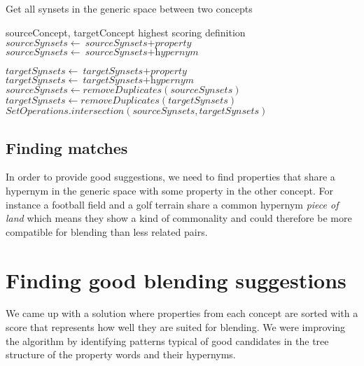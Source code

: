 \begin{algorithm}
	\caption{Get all synsets in the generic space between two concepts}\label{euclid}
	\begin{algorithmic}[1]
		\Require sourceConcept,
		targetConcept
		\Ensure highest scoring definition
		\State ${\textit{sourceSynsets} \gets {\textit{sourceSynsets} + \textit{property}}}$
		\State ${\textit{sourceSynsets} \gets {\textit{sourceSynsets} + \textit{hypernym}}}$
		\EndFor
		\EndFor
		
		\State ${\textit{targetSynsets} \gets {\textit{targetSynsets} + \textit{property}}}$
		\State ${\textit{targetSynsets} \gets {\textit{targetSynsets} + \textit{hypernym}}}$
		\EndFor
		\EndFor
		\State ${\textit{sourceSynsets} \gets {removeDuplicates(\textit{sourceSynsets})}}$
		\State ${\textit{targetSynsets} \gets {removeDuplicates(\textit{targetSynsets})}}$
		\State \Return ${SetOperations.intersection(\textit{sourceSynsets}, \textit{targetSynsets})}$
		\EndProcedure
	\end{algorithmic}
\end{algorithm}

\subsection{Finding matches}
In order to provide good suggestions, we need to find properties that share a hypernym in the generic space with some property in the other concept. For instance a football field and a golf terrain share a common hypernym \emph{piece of land} which means they show a kind of commonality and could therefore be more compatible for blending than less related pairs. 


\section{Finding good blending suggestions}
We came up with a solution where properties from each concept are sorted with a score that represents how well they are suited for blending. We were improving the algorithm by identifying patterns typical of good candidates in the tree structure of the property words and their hypernyms.

